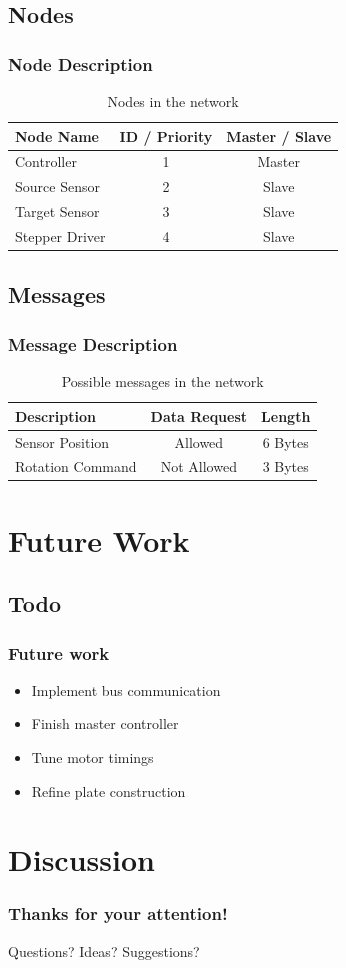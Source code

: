\documentclass{beamer}
\begin{document}
\subsection{Nodes}
\begin{frame}
  \frametitle{Node Description}
  \begin{table}
\begin{tabular}{l | c | c }
Node Name & ID / Priority & Master / Slave \\
\hline \hline
Controller & 1 & Master \\
Source Sensor & 2 & Slave \\
Target Sensor & 3 & Slave \\
Stepper Driver & 4 & Slave
\end{tabular}
\caption{Nodes in the network}
\end{table}
\end{frame}

\subsection{Messages}
\begin{frame}
  \frametitle{Message Description}
  \begin{table}
\begin{tabular}{l | c | c }
Description & Data Request & Length \\
\hline \hline
Sensor Position & Allowed & 6 Bytes \\
Rotation Command & Not Allowed & 3 Bytes
\end{tabular}
\caption{Possible messages in the network}
\end{table}
\end{frame}

\section{Future Work}
\subsection{Todo}
\begin{frame}
  \frametitle{Future work}
    \begin{itemize}
    \item Implement bus communication
    \item Finish master controller
    \item Tune motor timings
    \item Refine plate construction
  \end{itemize}
\end{frame}

\section{Discussion}
\begin{frame}
  \frametitle{Thanks for your attention!}
  \huge{Questions? Ideas? Suggestions?}
\end{frame}
\end{document}
